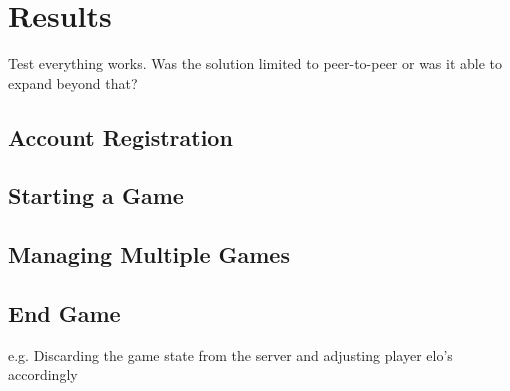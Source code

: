 \chapter{Results}
\label{chapter3}
Test everything works.
Was the solution limited to peer-to-peer or was it able to expand beyond that?

\section{Account Registration}

\section{Starting a Game}

\section{Managing Multiple Games}

\section{End Game}
e.g. Discarding the game state from the server and adjusting player elo's accordingly